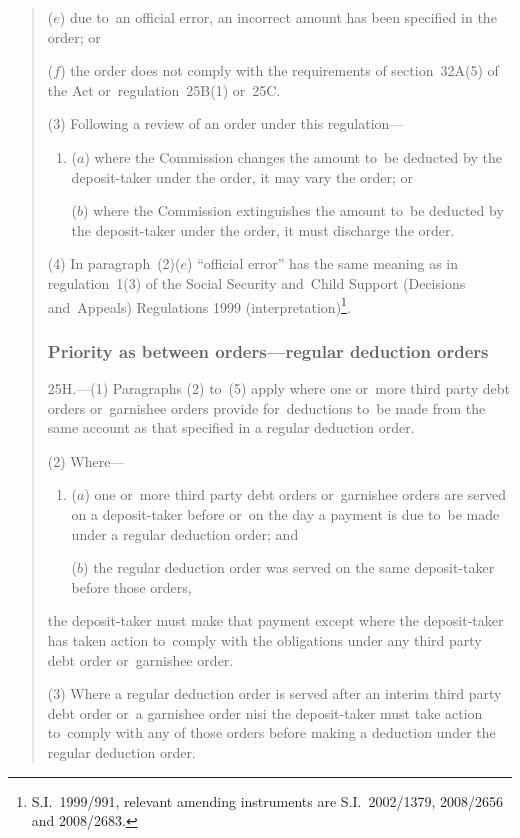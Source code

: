 \documentclass[12pt,a4paper]{article}
\begin{document}
\begin{quotation}
\begin{enumerate}
($e$) due to~an official error, an incorrect amount has been specified in the order; or

($f$) the order does not comply with the requirements of section~32A(5) of the Act or~regulation~25B(1) or~25C.
\end{enumerate}

(3) Following a review of an order under this regulation—
\begin{enumerate}\item[]
($a$) where the Commission changes the amount to~be deducted by the deposit-taker under the order, it may vary the order; or

($b$) where the Commission extinguishes the amount to~be deducted by the deposit-taker under the order, it must discharge the order.
\end{enumerate}

(4) In paragraph~(2)($e$)  “official error” has the same meaning as in regulation~1(3) of the Social Security and~Child Support (Decisions and~Appeals) Regulations 1999 (interpretation)\footnote{S.I.~1999/991, relevant amending instruments are S.I.~2002/1379, 2008/2656 and 2008/2683.}.

\subsubsection*{Priority as between orders---regular deduction orders}

25H.---(1)  Paragraphs (2) to~(5) apply where one or~more third party debt orders or~garnishee orders provide for~deductions to~be made from the same account as that specified in a regular deduction order.

(2) Where—
\begin{enumerate}\item[]
($a$) one or~more third party debt orders or~garnishee orders are served on a deposit-taker before or~on the day a payment is due to~be made under a regular deduction order; and

($b$) the regular deduction order was served on the same deposit-taker before those orders,
\end{enumerate}
the deposit-taker must make that payment except where the deposit-taker has taken action to~comply with the obligations under any third party debt order or~garnishee order.

(3) Where a regular deduction order is served after an interim third party debt order or~a garnishee order nisi the deposit-taker must take action to~comply with any of those orders before making a deduction under the regular deduction order.


\end{quotation}
\end{document}
